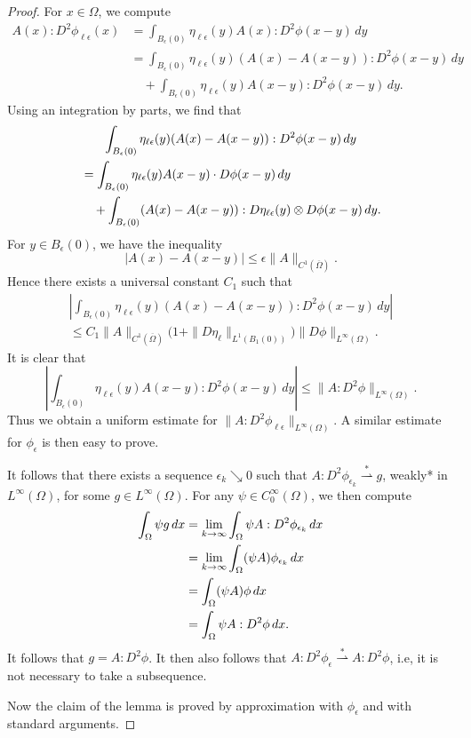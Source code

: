 \documentclass[a4paper]{article}
\let\div\relax\DeclareMathOperator{\div}{div}
\theoremstyle{remark}
\begin{document}
\begin{proof}
For $x \in \Omega$, we compute
\[
\begin{split}
A(x) : D^2 \phi_{\ell\epsilon}(x) &= \int_{B_\epsilon(0)} \eta_{\ell\epsilon}(y) A(x) : D^2\phi(x - y) \, dy \\
& = \int_{B_\epsilon(0)} \eta_{\ell\epsilon}(y) (A(x) - A(x - y)) : D^2\phi(x - y) \, dy \\
& \quad + \int_{B_\epsilon(0)} \eta_{\ell\epsilon}(y) A(x - y) : D^2\phi(x - y) \, dy.
\end{split}
\]
Using an integration by parts, we find that
\begin{multline*}
\int_{B_\epsilon(0)} \eta_{\ell\epsilon}(y) (A(x) - A(x - y)) : D^2\phi(x - y) \, dy \\
\begin{aligned}
&= \int_{B_\epsilon(0)} \eta_{\ell\epsilon}(y) \div A(x - y) \cdot D\phi(x - y) \, dy \\
& \quad + \int_{B_\epsilon(0)} (A(x) - A(x - y)) : D\eta_{\ell\epsilon}(y) \otimes D\phi(x - y) \, dy.
\end{aligned}
\end{multline*}
For $y \in B_\epsilon(0)$, we have the inequality
\[
|A(x) - A(x - y)| \le \epsilon \|A\|_{C^1(\overline{\Omega})}.
\]
Hence there exists a universal constant $C_1$ such that
\begin{multline*}
\left|\int_{B_\epsilon(0)} \eta_{\ell\epsilon}(y) (A(x) - A(x - y)) : D^2\phi(x - y) \, dy\right| \\
\le C_1\|A\|_{C^1(\overline{\Omega})} \bigl(1 + \|D\eta_\ell\|_{L^1(B_1(0))}\bigr) \|D\phi\|_{L^\infty(\Omega)}.
\end{multline*}
It is clear that
\[
\left|\int_{B_\epsilon(0)} \eta_{\ell\epsilon}(y) A(x - y) : D^2\phi(x - y) \, dy\right| \le \|A : D^2 \phi\|_{L^\infty(\Omega)}.
\]
Thus we obtain a uniform estimate for $\|A : D^2\phi_{\ell\epsilon}\|_{L^\infty(\Omega)}$. A similar estimate for $\phi_\epsilon$ is then easy to prove.

It follows that there exists a sequence $\epsilon_k \searrow 0$ such that
$A : D^2\phi_{\epsilon_k} \stackrel{*}{\rightharpoonup} g$, weakly* in
$L^\infty(\Omega)$, for some $g \in L^\infty(\Omega)$. For any $\psi \in C_0^\infty(\Omega)$, we then compute
\[
\begin{split}
\int_\Omega \psi g \, dx &= \lim_{k \to \infty} \int_\Omega \psi A : D^2 \phi_{\epsilon_k} \, dx \\
&= \lim_{k \to \infty} \int_\Omega \div \div (\psi A) \phi_{\epsilon_k} \, dx \\
&= \int_\Omega \div \div (\psi A) \phi \, dx \\
&= \int_\Omega \psi A : D^2 \phi \, dx.
\end{split}
\]
It follows that $g = A : D^2\phi$. It then also follows that $A : D^2\phi_\epsilon \stackrel{*}{\rightharpoonup} A : D^2\phi$, i.e, it
is not necessary to take a subsequence.

Now the claim of the lemma is proved by approximation with $\phi_\epsilon$
and with standard arguments.
\end{proof}
\end{document}
